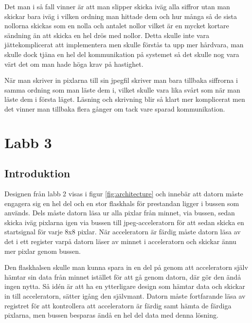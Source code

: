 \documentclass[a4paper]{article}
\begin{document}
Det man i så fall vinner är att man slipper skicka iväg alla siffror utan man skickar bara iväg i vilken ordning man hittade dem och hur många så de sista nollorna skickas som en nolla och antalet nollor vilket är en mycket kortare sändning än att skicka en hel drös med nollor. Detta skulle inte vara jättekomplicerat att implementera men skulle förstås ta upp mer hårdvara, man skulle dock tjäna en hel del kommunikation på systemet så det skulle nog vara värt det om man hade höga krav på hastighet.

När man skriver in pixlarna till sin jpegfil skriver man bara tillbaka siffrorna i samma ordning som man läste dem i, vilket skulle vara lika svårt som när man läste dem i första läget. Läsning och skrivning blir så klart mer komplicerat men det vinner man tillbaka flera gånger om tack vare sparad kommunikation.

\section{Labb 3}
\subsection{Introduktion}
Designen från labb 2 visas i figur \ref{fig:architecture} och innebär att datorn måste engagera sig en hel del och en stor flaskhals för prestandan ligger i bussen som används. Dels måste datorn läsa ur alla pixlar från minnet, via bussen, sedan skicka iväg pixlarna igen via bussen till jpeg-acceleratorn för att sedan skicka en startsignal för varje 8x8 pixlar. När acceleratorn är färdig måste datorn läsa av det i ett register varpå datorn läser av minnet i acceleratorn och skickar ännu mer pixlar genom bussen. 

Den flaskhalsen skulle man kunna spara in en del på genom att acceleratorn själv hämtar sin data från minnet istället för att gå genom datorn, där gör den ändå ingen nytta. Så idén är att ha en ytterligare design som hämtar data och skickar in till acceleratorn, sätter igång den självmant. Datorn måste fortfarande läsa av registret för att kontrollera att acceleratorn är färdig samt hämta de färdiga pixlarna, men bussen besparas ändå en hel del data med denna lösning.
\end{document}
